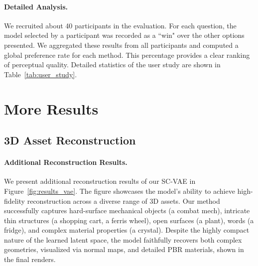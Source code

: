 \documentclass[10pt,twocolumn,letterpaper]{article}
\newcommand{\paravspace}{\vspace{-11pt}}
\begin{document}
\paravspace
\paragraph{Detailed Analysis.}
We recruited about 40 participants in the evaluation.
For each question, the model selected by a participant was recorded as a ``win" over the other options presented. We aggregated these results from all participants and computed a global preference rate for each method. This percentage provides a clear ranking of perceptual quality. Detailed statistics of the user study are shown in Table~\ref{tab:user_study}.


\section{More Results}

\subsection{3D Asset Reconstruction}

\paragraph{Additional Reconstruction Results.}
We present additional reconstruction results of our SC-VAE in Figure~\ref{fig:results_vae}. The figure showcases the model's ability to achieve high-fidelity reconstruction across a diverse range of 3D assets. Our method successfully captures hard-surface mechanical objects (a combat mech), intricate thin structures (a shopping cart, a ferris wheel), open surfaces (a plant), words (a fridge), and complex material properties (a crystal). Despite the highly compact nature of the learned latent space, the model faithfully recovers both complex geometries, visualized via normal maps, and detailed PBR materials, shown in the final renders.
\end{document}
